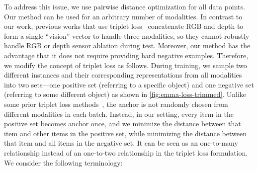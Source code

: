 \documentclass[10pt]{article} %
\newcommand{\todokdinline}[1]{\todo[color=red!20,inline]{{KD: \small #1}}}
\newcommand{\todoffinline}[1]{\todo[inline,color=blue!20]{\small #1 -- Frank}}
\begin{document}
To address this issue, we use pairwise distance optimization for all data points. %
Our method can be used for an arbitrary number of modalities. %
In contrast to our work, previous works that use triplet loss~\citep{GoLD_UMBC,triplet_loss_2021_CVPR} concatenate RGB and depth to form a single ``vision'' vector to handle three modalities, so they cannot robustly handle RGB or depth sensor ablation during test.
Moreover, our method has the advantage that it does not require providing hard negative examples.
Therefore, we modify the concept of triplet loss as follows. During training, we sample two different instances and their corresponding representations from all modalities into two sets---one positive set (referring to a specific object) and one negative set (referring to some different object) as shown in \cref{fig:emma-loss-trimmed}.
Unlike some prior triplet loss methods~\citep{GoLD_UMBC,triplet_loss_2021_CVPR}, the anchor is not randomly chosen from different modalities in each batch. Instead, in our setting, every item in the positive set becomes anchor once, and we minimize the distance between that item and other items in the positive set, while minimizing the distance between that item and all items in the negative set. It can be seen as an one-to-many relationship instead of an one-to-two relationship in the triplet loss formulation.
We consider the following terminology:
\end{document}
